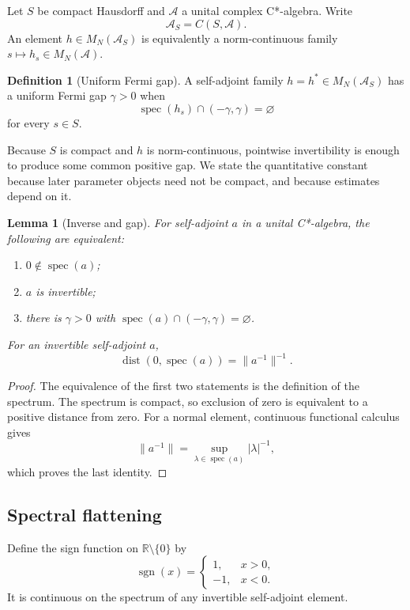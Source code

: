 \documentclass[12pt]{article}
\newtheorem{lemma}[theorem]{Lemma}
\theoremstyle{definition}
\newtheorem{definition}[theorem]{Definition}
\theoremstyle{remark}
\newcommand{\A}{\mathcal A}
\newcommand{\spec}{\operatorname{spec}}
\newcommand{\sgn}{\operatorname{sgn}}
\newcommand{\dist}{\operatorname{dist}}
\newcommand{\R}{\mathbb R}
\begin{document}
Let $S$ be compact Hausdorff and $\A$ a unital complex C*-algebra.
Write
\[
\A_S=C(S,\A).
\]
An element $h\in M_N(\A_S)$ is equivalently a norm-continuous family
$s\mapsto h_s\in M_N(\A)$.

\begin{definition}[Uniform Fermi gap]
A self-adjoint family $h=h^*\in M_N(\A_S)$ has a uniform Fermi gap
$\gamma>0$ when
\[
\spec(h_s)\cap(-\gamma,\gamma)=\varnothing
\]
for every $s\in S$.
\end{definition}

Because $S$ is compact and $h$ is norm-continuous, pointwise invertibility is
enough to produce some common positive gap.
We state the quantitative constant because later parameter objects need not
be compact, and because estimates depend on it.

\begin{lemma}[Inverse and gap]
\label{lem:inverse-gap}
For self-adjoint $a$ in a unital C*-algebra, the following are equivalent:
\begin{enumerate}[label=(\roman*)]
  \item $0\notin\spec(a)$;
  \item $a$ is invertible;
  \item there is $\gamma>0$ with
  $\spec(a)\cap(-\gamma,\gamma)=\varnothing$.
\end{enumerate}
For an invertible self-adjoint $a$,
\[
\dist(0,\spec(a))=\|a^{-1}\|^{-1}.
\]
\end{lemma}

\begin{proof}
The equivalence of the first two statements is the definition of the
spectrum.
The spectrum is compact, so exclusion of zero is equivalent to a positive
distance from zero.
For a normal element, continuous functional calculus gives
\[
\|a^{-1}\|
=
\sup_{\lambda\in\spec(a)}|\lambda|^{-1},
\]
which proves the last identity.
\end{proof}

\subsection{Spectral flattening}

Define the sign function on $\R\setminus\{0\}$ by
\[
\sgn(x)=
\begin{cases}
1,&x>0,\\
-1,&x<0.
\end{cases}
\]
It is continuous on the spectrum of any invertible self-adjoint element.
\end{document}
